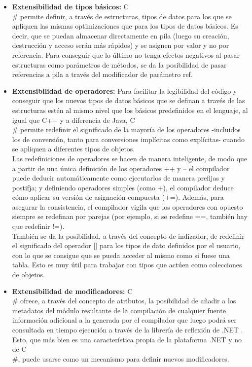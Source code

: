 \begin{itemize}
	\item \textbf{Extensibilidad de tipos b\'asicos: }  C\\# permite definir, a trav\'es de estructuras, tipos de datos para los que se apliquen las mismas optimizaciones que para los tipos de datos b\'asicos. Es decir, que se puedan almacenar directamente en pila (luego su creaci\'on, destrucci\'on y acceso ser\'an m\'as r\'apidos) y se asignen por valor y no por referencia. Para conseguir que lo \'ultimo no tenga efectos negativos al pasar estructuras como par\'ametros de m\'etodos, se da la posibilidad de pasar referencias a pila a trav\'es del modificador de par\'ametro ref. 

	\item \textbf{Extensibilidad de operadores: } Para facilitar la legibilidad del c\'odigo y conseguir que los nuevos tipos de datos b\'asicos que se definan a trav\'es de las estructuras est\'en al mismo nivel que los b\'asicos predefinidos en el lenguaje, al igual que C++ y a diferencia de Java, C\\# permite redefinir el significado de la mayor\'ia de los operadores -incluidos los de conversi\'on, tanto para conversiones impl\'icitas como expl\'icitas- cuando se apliquen a diferentes tipos de objetos.\\

	Las redefiniciones de operadores se hacen de manera inteligente, de modo que a partir de una \'unica definici\'on de los operadores ++ y -- el compilador puede deducir autom\'aticamente como ejecutarlos de manera prefijas y postifja; y definiendo operadores simples (como +), el compilador deduce c\'omo aplicar su versi\'on de asignaci\'on compuesta (+=). Adem\'as, para asegurar la consistencia, el compilador vigila que los operadores con opuesto siempre se redefinan por parejas (por ejemplo, si se redefine ==, tambi\'en hay que redefinir !=).\\

	Tambi\'en se da la posibilidad, a trav\'es del concepto de indizador, de redefinir el significado del operador [] para los tipos de dato definidos por el usuario, con lo que se consigue que se pueda acceder al mismo como si fuese una tabla. Esto es muy \'util para trabajar con tipos que act\'uen como colecciones de objetos. 

	\item \textbf{Extensibilidad de modificadores: } C\\# ofrece, a trav\'es del concepto de atributos, la posibilidad de a\~nadir a los metadatos del m\'odulo resultante de la compilaci\'on de cualquier fuente informaci\'on adicional a la generada por el compilador que luego podr\'a ser consultada en tiempo ejecuci\'on a trav\'es de la librer\'ia de reflexi\'on de .NET . Esto, que m\'as bien es una caracter\'istica propia de la plataforma .NET y no de C\\#, puede usarse como un mecanismo para definir nuevos modificadores. 


\end{itemize}
